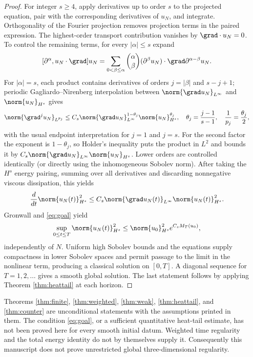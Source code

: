 \begin{proof}
For integer $s\ge4$, apply derivatives up to order $s$ to the projected equation, pair with the corresponding derivatives of $u_N$, and integrate. Orthogonality of the Fourier projection removes projection terms in the paired expression. The highest-order transport contribution vanishes by $\grad\cdot u_N=0$. To control the remaining terms, for every $|\alpha|\le s$ expand
\[
[\partial^\alpha,u_N\cdot\grad]u_N
=\sum_{0<\beta\le\alpha}\binom{\alpha}{\beta}
(\partial^\beta u_N)\cdot\grad\partial^{\alpha-\beta}u_N.
\]
For $|\alpha|=s$, each product contains derivatives of orders $j=|\beta|$ and $s-j+1$; periodic Gagliardo--Nirenberg interpolation between $\norm{\grad u_N}_{L^\infty}$ and $\norm{u_N}_{H^s}$ gives
\[
\norm{\grad^j u_N}_{L^{p_j}}
\le C_s\norm{\grad u_N}_{L^\infty}^{1-\theta_j}
\norm{u_N}_{H^s}^{\theta_j},\quad
\theta_j=\frac{j-1}{s-1},\quad \frac1{p_j}=\frac{\theta_j}{2},
\]
with the usual endpoint interpretation for $j=1$ and $j=s$. For the second factor the exponent is $1-\theta_j$, so Holder's inequality puts the product in $L^2$ and bounds it by $C_s\norm{\grad u_N}_{L^\infty}\norm{u_N}_{H^s}$. Lower orders are controlled identically (or directly using the inhomogeneous Sobolev norm). After taking the $H^s$ energy pairing, summing over all derivatives and discarding nonnegative viscous dissipation, this yields
\[
\frac{d}{dt}\norm{u_N(t)}_{H^s}^2
\le C_s\norm{\grad u_N(t)}_{L^\infty}\norm{u_N(t)}_{H^s}^2.
\]
Gronwall and \eqref{eq:goal} yield
\[
\sup_{0\le t\le T}\norm{u_N(t)}_{H^s}^2
\le\norm{u_0}_{H^s}^2e^{C_sM_T(u_0)},
\]
independently of $N$. Uniform high Sobolev bounds and the equations supply compactness in lower Sobolev spaces and permit passage to the limit in the nonlinear term, producing a classical solution on $[0,T]$. A diagonal sequence for $T=1,2,\ldots$ gives a smooth global solution. The last statement follows by applying Theorem \ref{thm:heattail} at each horizon.
\end{proof}
\begin{remark}
Theorems \ref{thm:finite}, \ref{thm:weighted}, \ref{thm:weak}, \ref{thm:heattail}, and \ref{thm:counter} are unconditional statements with the assumptions printed in them. The condition \eqref{eq:goal}, or a sufficient quantitative heat-tail estimate, has not been proved here for every smooth initial datum. Weighted time regularity and the total energy identity do not by themselves supply it. Consequently this manuscript does not prove unrestricted global three-dimensional regularity.
\end{remark}



